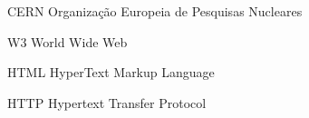 %
%

\begin{siglas}
    \item[CERN] Organização Europeia de Pesquisas Nucleares
    \item[W3] World Wide Web
    \item[HTML] HyperText Markup Language
    \item[HTTP] Hypertext Transfer Protocol
\end{siglas}
